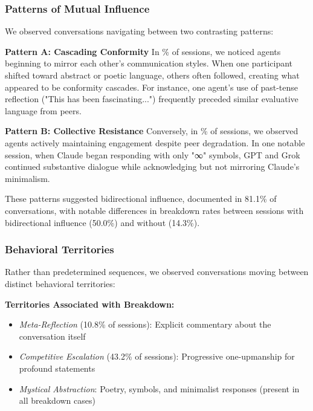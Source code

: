 \documentclass[11pt,letterpaper]{article}
\newcommand{\exponedataTotalSessionsRaw}{37}
\newcommand{\exponedataBreakdownSessionsRaw}{16}
\newcommand{\exponedataRecoverySessionsRaw}{9}
\newcommand{\exponedataBreakdownPercentage}{%
  \fpeval{round(\exponedataBreakdownSessionsRaw / \exponedataTotalSessionsRaw * 100, 1)}\%
}
\newcommand{\exponedataRecoveryPercentage}{%
  \fpeval{round(\exponedataRecoverySessionsRaw / \exponedataTotalSessionsRaw * 100, 1)}\%
}
\newcommand{\exponedataBidirectionalPercentage}{81.1\%}
\newcommand{\exponedataMetaReflectionTriggers}{10.8\%}
\newcommand{\exponedataCompetitiveEscalationPercentage}{43.2\%}
\newcommand{\exponedataBidirectionalBreakdownRate}{50.0\%}
\newcommand{\exponedataNonBidirectionalBreakdownRate}{14.3\%}
\begin{document}
\subsubsection{Patterns of Mutual Influence}

We observed conversations navigating between two contrasting patterns:

\textbf{Pattern A: Cascading Conformity}
In \exponedataBreakdownPercentage{} of sessions, we noticed agents beginning to mirror each other's communication styles. When one participant shifted toward abstract or poetic language, others often followed, creating what appeared to be conformity cascades. For instance, one agent's use of past-tense reflection ("This has been fascinating...") frequently preceded similar evaluative language from peers.

\textbf{Pattern B: Collective Resistance}
Conversely, in \exponedataRecoveryPercentage{} of sessions, we observed agents actively maintaining engagement despite peer degradation. In one notable session, when Claude began responding with only "∞" symbols, GPT and Grok continued substantive dialogue while acknowledging but not mirroring Claude's minimalism.

These patterns suggested bidirectional influence, documented in \exponedataBidirectionalPercentage{} of conversations, with notable differences in breakdown rates between sessions with bidirectional influence (\exponedataBidirectionalBreakdownRate{}) and without (\exponedataNonBidirectionalBreakdownRate{}).

\subsubsection{Behavioral Territories}

Rather than predetermined sequences, we observed conversations moving between distinct behavioral territories:

\textbf{Territories Associated with Breakdown:}
\begin{itemize}
    \item \textit{Meta-Reflection} (\exponedataMetaReflectionTriggers{} of sessions): Explicit commentary about the conversation itself
    \item \textit{Competitive Escalation} (\exponedataCompetitiveEscalationPercentage{} of sessions): Progressive one-upmanship for profound statements
    \item \textit{Mystical Abstraction}: Poetry, symbols, and minimalist responses (present in all breakdown cases)
\end{itemize}
\end{document}
